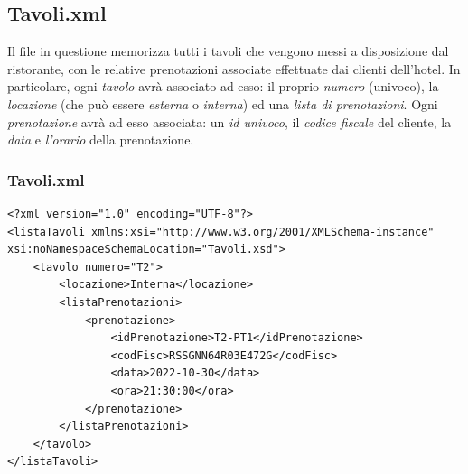 \documentclass [a4paper, 12pt]{book}
\begin{document}
\medskip

\subsection{Tavoli.xml}
Il file in questione memorizza tutti i tavoli che vengono messi a disposizione dal ristorante, con le relative prenotazioni associate effettuate dai clienti dell'hotel. In particolare, ogni \textit{tavolo} avrà associato ad esso: il proprio \textit{numero} (univoco), la \textit{locazione} (che può essere \textit{esterna} o \textit{interna}) ed una \textit{lista di prenotazioni}. Ogni \textit{prenotazione} avrà ad esso associata: un \textit{id univoco}, il \textit{codice fiscale} del cliente, la \textit{data} e \textit{l'orario} della prenotazione.
\subsubsection{Tavoli.xml}
\begin{lstlisting}[style=XML]
<?xml version="1.0" encoding="UTF-8"?>
<listaTavoli xmlns:xsi="http://www.w3.org/2001/XMLSchema-instance" xsi:noNamespaceSchemaLocation="Tavoli.xsd">
    <tavolo numero="T2">
        <locazione>Interna</locazione>
        <listaPrenotazioni>
            <prenotazione>
            	<idPrenotazione>T2-PT1</idPrenotazione>
                <codFisc>RSSGNN64R03E472G</codFisc>
                <data>2022-10-30</data>
                <ora>21:30:00</ora>
            </prenotazione>
        </listaPrenotazioni>
    </tavolo>
</listaTavoli>
\end{lstlisting}
\end{document}
